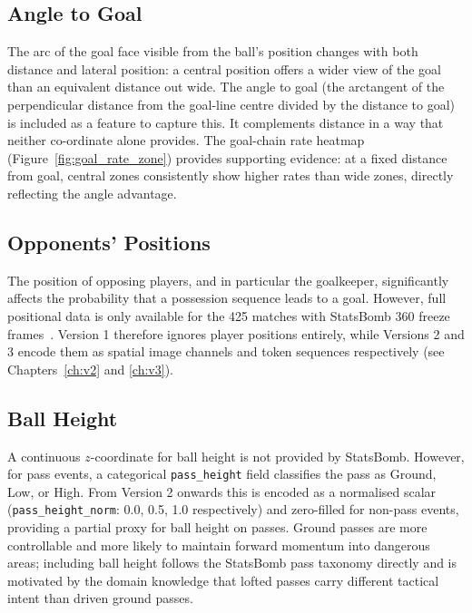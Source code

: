 \subsection{Angle to Goal}

The arc of the goal face visible from the ball's position changes with both distance and lateral position: a central position offers a wider view of the goal than an equivalent distance out wide. The angle to goal (the arctangent of the perpendicular distance from the goal-line centre divided by the distance to goal) is included as a feature to capture this. It complements distance in a way that neither co-ordinate alone provides. The goal-chain rate heatmap (Figure~\ref{fig:goal_rate_zone}) provides supporting evidence: at a fixed distance from goal, central zones consistently show higher rates than wide zones, directly reflecting the angle advantage.

\subsection{Opponents' Positions}

The position of opposing players, and in particular the goalkeeper, significantly affects the probability that a possession sequence leads to a goal. However, full positional data is only available for the 425 matches with StatsBomb 360 freeze frames~\cite{statsbomb360}. Version 1 therefore ignores player positions entirely, while Versions 2 and 3 encode them as spatial image channels and token sequences respectively (see Chapters~\ref{ch:v2} and \ref{ch:v3}). 

\subsection{Ball Height}

A continuous $z$-coordinate for ball height is not provided by StatsBomb. However, for pass events, a categorical \texttt{pass\_height} field classifies the pass as Ground, Low, or High. From Version 2 onwards this is encoded as a normalised scalar (\texttt{pass\_height\_norm}: 0.0, 0.5, 1.0 respectively) and zero-filled for non-pass events, providing a partial proxy for ball height on passes. Ground passes are more controllable and more likely to maintain forward momentum into dangerous areas; including ball height follows the StatsBomb pass taxonomy directly and is motivated by the domain knowledge that lofted passes carry different tactical intent than driven ground passes.

